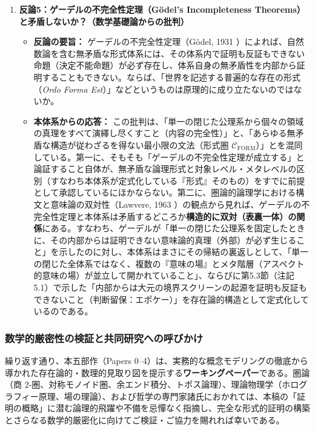 \documentclass[11pt,a4paper]{ltjsarticle}
\theoremstyle{definition}
\theoremstyle{plain}
\begin{document}
\begin{enumerate}
    \item \textbf{反論5：ゲーデルの不完全性定理（G\"odel's Incompleteness Theorems）と矛盾しないか？（数学基礎論からの批判）}
    \begin{itemize}
        \item \textbf{反論の要旨：} ゲーデルの不完全性定理（G\"odel, 1931 \cite{Godel1931}）によれば、自然数論を含む無矛盾な形式体系には、その体系内で証明も反証もできない命題（決定不能命題）が必ず存在し、体系自身の無矛盾性を内部から証明することもできない。ならば、「世界を記述する普遍的な存在の形式（\textit{Ordo Forma Est}）」などというものは原理的に成り立たないのではないか。
        \item \textbf{本体系からの応答：} この批判は、「単一の閉じた公理系から個々の領域の真理をすべて演繹し尽くすこと（内容の完全性）」と、「あらゆる無矛盾な構造が従わざるを得ない最小限の文法（形式圏 $\mathcal{C}_{\mathrm{FORM}}$）」とを混同している。第一に、そもそも「ゲーデルの不完全性定理が成立する」と論証すること自体が、無矛盾な論理形式と対象レベル・メタレベルの区別（すなわち本体系が定式化している『形式』そのもの）をすでに前提として承認しているにほかならない。第二に、圏論的論理学における構文と意味論の双対性（Lawvere, 1963 \cite{Lawvere1963}）の観点から見れば、ゲーデルの不完全性定理と本体系は矛盾するどころか\textbf{構造的に双対（表裏一体）の関係}にある。すなわち、ゲーデルが「単一の閉じた公理系を固定したときに、その内部からは証明できない意味論的真理（外部）が必ず生じること」を示したのに対し、本体系はまさにその帰結の裏返しとして、「単一の閉じた全体系ではなく、複数の『意味の場』とメタ階層（アスペクト的意味の場）が並立して開かれていること」、ならびに第5.3節（注記 5.1）で示した「内部からは大元の境界スクリーンの起源を証明も反証もできないこと（判断留保：エポケー）」を存在論的構造として定式化しているのである。
    \end{itemize}
\end{enumerate}
\subsubsection*{数学的厳密性の検証と共同研究への呼びかけ}
繰り返す通り、本五部作（Papers 0--4）は、実務的な概念モデリングの徹底から導かれた存在論的・数理的見取り図を提示する\textbf{ワーキングペーパー}である。圏論（商 2-圏、対称モノイド圏、余エンド積分、トポス論理）、理論物理学（ホログラフィー原理、場の理論）、および哲学の専門家諸氏におかれては、本稿の「証明の概略」に潜む論理的飛躍や不備を忌憚なく指摘し、完全な形式的証明の構築とさらなる数学的厳密化に向けてご検証・ご協力を賜れれば幸いである。
\end{document}
